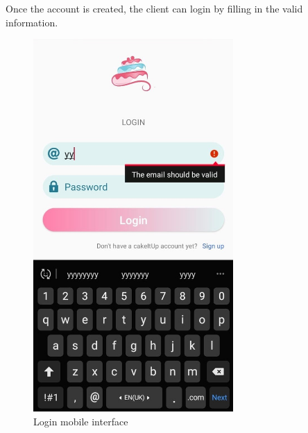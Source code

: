 \documentclass[12pt,a4paper]{report}
\begin{document}
\clearpage
Once the account is created, the client can login by filling in the valid information.
\begin{figure}[H]
	\vspace*{1in}
	\centering
	\includegraphics[width=3in,keepaspectratio]{loginmobile.jpg}
	\caption{Login mobile interface}
	\label{login-mobile-interface}
\end{figure} 
\clearpage
\end{document}
